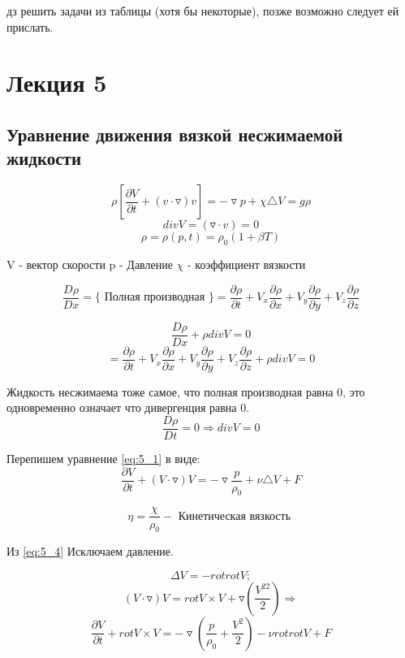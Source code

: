 \documentclass[12pt, a4paper]{article}
\begin{document}
дз решить задачи из таблицы (хотя бы некоторые), позже возможно следует ей прислать.

\section{Лекция 5}

\subsection{Уравнение движения вязкой несжимаемой жидкости}

\begin{equation}\label{eq:5_1}
\rho [\frac{\partial V }{\partial t } + (v \cdot \triangledown)v] = - \triangledown p + \chi \triangle V = g \rho
\end{equation}
\begin{equation}\label{eq:5_2}
div V = (\triangledown \cdot v) = 0
\end{equation}
\begin{equation}\label{eq:5_3}
\rho = \rho(p, t) = \rho_0 (1 + \beta T)
\end{equation}

V - вектор скорости
p - Давление
$ \chi $ - коэффициент вязкости

\[ \frac{D \rho}{D x} = \{ \textrm{ Полная производная  } \} = \frac{\partial \rho}{\partial t} + V_x \frac{\partial \rho}{\partial x} + V_y \frac{\partial \rho}{\partial y} + V_z \frac{\partial \rho}{\partial z} \]

\[  \frac{D \rho}{D x} + \rho div V = 0 \]
\[ = \frac{\partial \rho}{\partial t} + V_x \frac{\partial \rho}{\partial x} + V_y \frac{\partial \rho}{\partial y} + V_z \frac{\partial \rho}{\partial z} + \rho div V = 0\]

Жидкость несжимаема тоже самое, что полная производная равна 0, это одновременно означает что дивергенция равна 0.
\[ \frac{D\rho}{Dt} = 0 \Rightarrow div V = 0 \]

Перепишем уравнение \ref{eq:5_1} в виде:
\[ \frac{\partial V}{\partial t} + (V \cdot \triangledown) V = - \triangledown \frac{p}{\rho_0} + \nu \triangle V + F \]

\begin{equation}\label{eq:5_4}
\eta = \frac{\chi}{\rho_0} - \textrm{ Кинетическая вязкость }
\end{equation}

Из \ref{eq:5_4} Исключаем давление.

\[ \Delta V = - rotrot V; \]
\[ (V \cdot \triangledown) V = rot V \times V + \triangledown(\frac{V^22}{2}) \Rightarrow \]
\begin{equation}\label{eq:5_5}
\frac{\partial V}{\partial t} + rot V \times V = -\triangledown (\frac{p}{\rho_0} + \frac{V^2}{2}) - \nu rot rot V + F
\end{equation}
\end{document}
